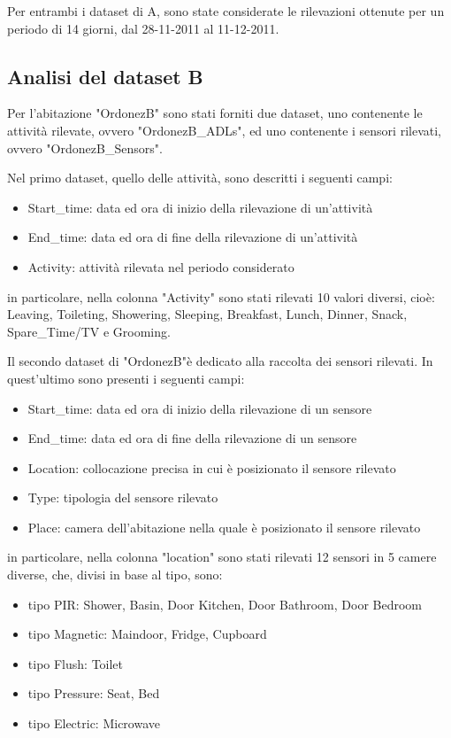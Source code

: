 \documentclass[10pt,a4paper]{article}
\begin{document}
Per entrambi i dataset di A, sono state considerate le rilevazioni ottenute per un periodo di 14 giorni, dal 28-11-2011 al 11-12-2011.

\subsection{Analisi del dataset B}

Per l'abitazione "OrdonezB" sono stati forniti due dataset, uno contenente le attività rilevate, ovvero "OrdonezB\_ADLs", ed uno contenente i sensori rilevati, ovvero "OrdonezB\_Sensors".

Nel primo dataset, quello delle attività, sono descritti i seguenti campi:

\begin{itemize}
	\item Start\_time: data ed ora di inizio della rilevazione di un'attività
	\item End\_time: data ed ora di fine della rilevazione di un'attività
	\item  Activity: attività rilevata nel periodo considerato
\end{itemize}

in particolare, nella colonna "Activity" sono stati rilevati 10 valori diversi, cioè: Leaving, Toileting, Showering, Sleeping, Breakfast, Lunch, Dinner, Snack, Spare\_Time/TV e Grooming. 

Il secondo dataset di "OrdonezB"è dedicato alla raccolta dei sensori rilevati. In quest'ultimo sono presenti i seguenti campi:
\begin{itemize}
	\item Start\_time: data ed ora di inizio della rilevazione di un sensore
	\item End\_time: data ed ora di fine della rilevazione di un sensore
	\item  Location: collocazione precisa in cui è posizionato il sensore rilevato
	\item Type: tipologia del sensore rilevato
	\item Place: camera dell'abitazione nella quale è posizionato il sensore rilevato
\end{itemize}

in particolare, nella colonna "location" sono stati rilevati 12 sensori in 5 camere diverse, che, divisi in base al tipo, sono:

\begin{itemize}
	\item tipo PIR: Shower, Basin, Door Kitchen, Door Bathroom, Door Bedroom
	\item tipo Magnetic: Maindoor, Fridge, Cupboard
	\item  tipo Flush: Toilet
	\item tipo Pressure: Seat, Bed
	\item tipo Electric: Microwave
\end{itemize}
\end{document}
